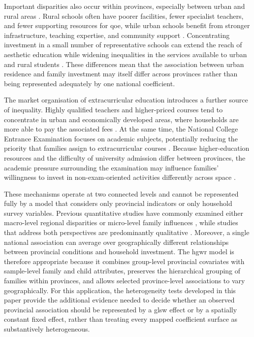\documentclass[times]{interact}
\theoremstyle{plain}%
\theoremstyle{definition}
\theoremstyle{remark}
\begin{document}
Important disparities also occur within provinces, especially between urban and rural areas \citep{Lin-2009}.
Rural schools often have poorer facilities, fewer specialist teachers, and fewer supporting resources for \gls{qoe}, while urban schools benefit from stronger infrastructure, teaching expertise, and community support \citep{Li-2014-en,XiangStillwell-2020,SuYuan-2023,Xie-2022,ZhangLiang-2022,Zhang-2024,SunHu-2023}.
Concentrating investment in a small number of representative schools can extend the reach of aesthetic education while widening inequalities in the services available to urban and rural students \citep{Xing-2020}.
These differences mean that the association between urban residence and family investment may itself differ across provinces rather than being represented adequately by one national coefficient.

The market organisation of extracurricular education introduces a further source of inequality.
Highly qualified teachers and higher-priced courses tend to concentrate in urban and economically developed areas, where households are more able to pay the associated fees \citep{Liu-2024,YangQiu-2016,Wang-2021a}.
At the same time, the National College Entrance Examination focuses on academic subjects, potentially reducing the priority that families assign to extracurricular courses \citep{LiAbbasi-2013}.
Because higher-education resources and the difficulty of university admission differ between provinces, the academic pressure surrounding the examination may influence families' willingness to invest in non-exam-oriented activities differently across space \citep{Shang-2024,Liu-2024}.

These mechanisms operate at two connected levels and cannot be represented fully by a model that considers only provincial indicators or only household survey variables.
Previous quantitative studies have commonly examined either macro-level regional disparities \citep{Wang-2010,XiaoLiu-2014,XiangStillwell-2020,WuKC-2022,SunHu-2023,Song-2023a,HanNi-2023} or micro-level family influences \citep{HannumWang-2006,Wang-2018,TanCai-2022}, while studies that address both perspectives are predominantly qualitative \citep{Dello-Iacovo-2009,ChungMason-2012}.
Moreover, a single national association can average over geographically different relationships between provincial conditions and household investment.
The \gls{hgwr} model is therefore appropriate because it combines group-level provincial covariates with sample-level family and child attributes, preserves the hierarchical grouping of families within provinces, and allows selected province-level associations to vary geographically.
For this application, the heterogeneity tests developed in this paper provide the additional evidence needed to decide whether an observed provincial association should be represented by a \gls{glsw} effect or by a spatially constant fixed effect, rather than treating every mapped coefficient surface as substantively heterogeneous.
\end{document}
